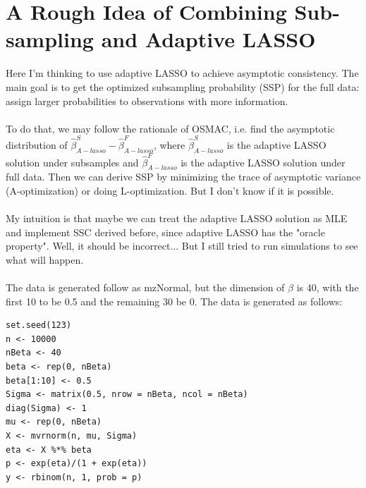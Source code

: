\documentclass[]{article}
\begin{document}
\section{A Rough Idea of Combining Sub-sampling and Adaptive LASSO}
Here I’m thinking to use adaptive LASSO to achieve asymptotic consistency. The main goal is to get the optimized subsampling probability (SSP) for the full data: assign larger probabilities to observations with more information.\\
\\
To do that, we may follow the rationale of OSMAC, i.e. find the asymptotic distribution of $\hat{\beta}_{A-lasso}^{S}-\hat{\beta}_{A-lasso}^{F}$, where $\hat{\beta}_{A-lasso}^{S}$ is the adaptive LASSO solution under subsamples and $\hat{\beta}_{A-lasso}^{F}$ is the adaptive LASSO solution under full data. Then we can derive SSP by minimizing the trace of asymptotic variance (A-optimization) or doing L-optimization. But I don’t know if it is possible.\\
\\
My intuition is that maybe we can treat the adaptive LASSO solution as MLE and implement SSC derived before, since adaptive LASSO has the "oracle property". Well, it should be incorrect...
But I still tried to run simulations to see what will happen.\\
\\
The data is generated follow as mzNormal, but the dimension of $\beta$ is 40, with the first 10 to be 0.5 and the remaining 30 be 0. The data is generated as follows:\\
\begin{lstlisting}
set.seed(123)
n <- 10000
nBeta <- 40
beta <- rep(0, nBeta)
beta[1:10] <- 0.5
Sigma <- matrix(0.5, nrow = nBeta, ncol = nBeta)
diag(Sigma) <- 1
mu <- rep(0, nBeta)
X <- mvrnorm(n, mu, Sigma)
eta <- X %*% beta
p <- exp(eta)/(1 + exp(eta))
y <- rbinom(n, 1, prob = p)
\end{lstlisting}
\end{document}
